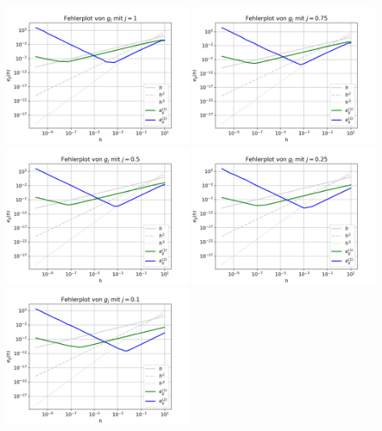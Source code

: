 \documentclass{scrartcl}
\begin{document}
\vspace{0.4cm}
{
  \centering
    \includegraphics[width=0.45\textwidth]{Grafiken/Fehlerplot_j1}
    \includegraphics[width=0.45\textwidth]{Grafiken/Fehlerplot_j075}\\
    \includegraphics[width=0.45\textwidth]{Grafiken/Fehlerplot_j05}
    \includegraphics[width=0.45\textwidth]{Grafiken/Fehlerplot_j025}\\
    \includegraphics[width=0.45\textwidth]{Grafiken/Fehlerplot_j01}
}
\end{document}
